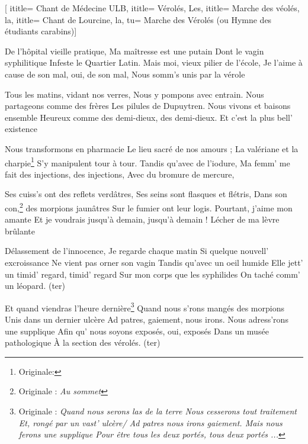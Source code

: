  [
ititle= {Chant de Médecine ULB},
ititle= {Vérolés, Les},
ititle= {Marche des véolés, la},
ititle= {Chant de Lourcine, la},
tu= {Marche des Vérolés (ou Hymne des étudiants carabins)}]


\beginverse
De l'hôpital vieille pratique,
Ma maîtresse est une putain
Dont le vagin syphilitique
Infeste le Quartier Latin.
Mais moi, vieux pilier de l'école,
Je l'aime à cause de son mal, oui, de son mal,
Nous somm's unis par la vérole
\endverse

\beginverse
Tous les matins, vidant nos verres,
Nous y pompons avec entrain.
Nous partageons comme des frères
Les pilules de Dupuytren.
Nous vivons et baisons ensemble
Heureux comme des demi-dieux, des demi-dieux.
Et c'est la plus bell' existence
\endverse

\beginverse
Nous transformons en pharmacie
Le lieu sacré de nos amours ;
La valériane et la charpie\footnote {Originale: }
S'y manipulent tour à tour.
Tandis qu'avec de l'iodure,
Ma femm' me fait des injections, des injections,
Avec du bromure de mercure,
\endverse

\beginverse
Ses cuiss's ont des reflets verdâtres,
Ses seins sont flasques et flétris,
Dans son con,\footnote {Originale : \emph{Au sommet}} des morpions jaunâtres
Sur le fumier ont leur logis.
Pourtant, j'aime mon amante
Et je voudrais jusqu'à demain, jusqu'à demain !
Lécher de ma lèvre brûlante
\endverse

\beginverse
Délassement de l'innocence,
Je regarde chaque matin
Si quelque nouvell' excroissance
Ne vient pas orner son vagin
Tandis qu'avec un oeil humide
Elle jett' un timid' regard, timid' regard
Sur mon corps que les syphilides
On taché comm' un léopard. (ter)
\endverse

\beginverse
Et quand viendras l'heure dernière\footnote { Originale : \emph{Quand nous serons las de la terre Nous cesserons tout traitement Et, rongé par un vast' ulcère/ Ad patres nous irons gaiement. Mais nous ferons une supplique Pour être tous les deux portés, tous deux portés ...}}
Quand nous s'rons mangés des morpions
Unis dans un dernier ulcère
Ad patres, gaiement, nous irons.
Nous adress'rons une supplique
Afin qu' nous soyons exposés, oui, exposés
Dans un musée pathologique
À la section des vérolés. (ter)
\endverse

\endsong 
